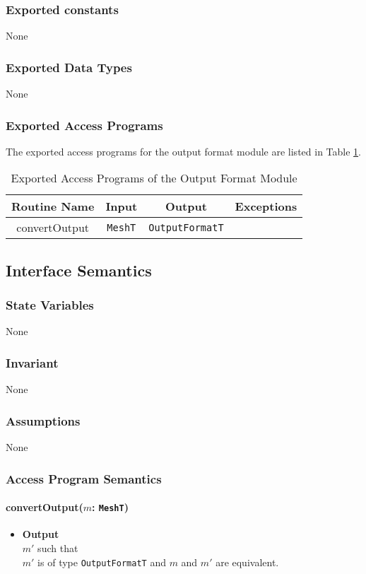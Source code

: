 \documentclass[12pt,titlepage]{article}
\begin{document}
\subsubsection{Exported constants} None
\subsubsection{Exported Data Types} None
\subsubsection{Exported Access Programs}
The exported access programs for the output format module are listed in Table \ref{AmisOutputEAP}.
\begin{table}[htbp]
\centering
\begin{tabular}{|c|c|c|c|}
\hline
Routine Name & Input & Output & Exceptions \\ 
\hline
convertOutput & {\tt MeshT} & {\tt OutputFormatT} & \\
\hline
\end{tabular}
\caption{Exported Access Programs of the Output Format Module}
\label{AmisOutputEAP} 
\end{table}

\subsection{Interface Semantics}
\subsubsection{State Variables}None
\subsubsection{Invariant} None
\subsubsection{Assumptions} None
\subsubsection{Access Program Semantics}

\paragraph{convertOutput($m$: {\tt MeshT})}
\begin{itemize}
\item \textbf{Output}\\ 
$m'$ such that\\
$m'$ is of type {\tt OutputFormatT} and $m$ and $m'$ are equivalent.
\end{itemize}
\end{document}
